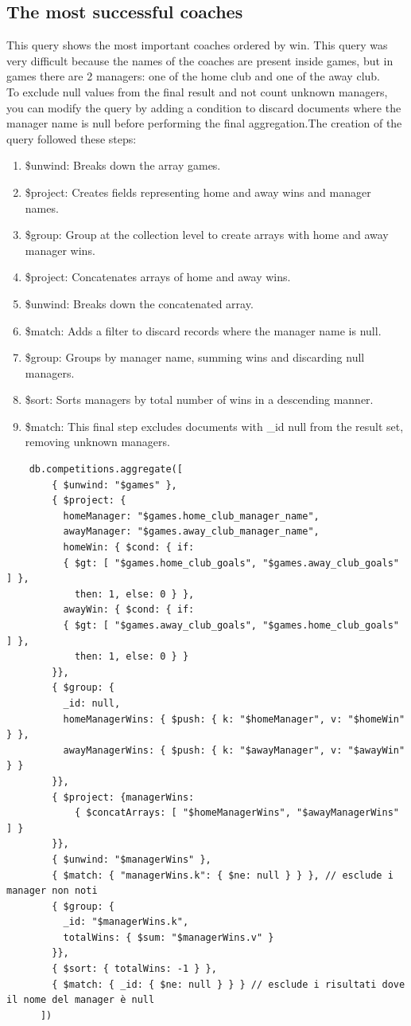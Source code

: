\documentclass{Configuration_Files/PoliMi3i_thesis}
\begin{document}
\subsection{The most successful coaches}
This query shows the most important coaches ordered by win. This query was very difficult because the names of the coaches are present inside games, but in games there are 2 managers: one of the home club and one of the away club.\\
To exclude null values from the final result and not count unknown managers, you can modify the query by adding a condition to discard documents where the manager name is null before performing the final aggregation.The creation of the query followed these steps:
\begin{enumerate}
    \item \$unwind: Breaks down the array games.
    \item \$project: Creates fields representing home and away wins and manager names.
    \item \$group: Group at the collection level to create arrays with home and away manager wins.
    \item \$project: Concatenates arrays of home and away wins.
    \item \$unwind: Breaks down the concatenated array.
    \item \$match: Adds a filter to discard records where the manager name is null.
    \item \$group: Groups by manager name, summing wins and discarding null managers.
    \item \$sort: Sorts managers by total number of wins in a descending manner.
    \item \$match: This final step excludes documents with \_id null from the result set, removing unknown managers.
\end{enumerate}
\begin{verbatim}
    db.competitions.aggregate([
        { $unwind: "$games" },
        { $project: {
          homeManager: "$games.home_club_manager_name",
          awayManager: "$games.away_club_manager_name",
          homeWin: { $cond: { if: 
          { $gt: [ "$games.home_club_goals", "$games.away_club_goals" ] }, 
            then: 1, else: 0 } },
          awayWin: { $cond: { if: 
          { $gt: [ "$games.away_club_goals", "$games.home_club_goals" ] }, 
            then: 1, else: 0 } }
        }},
        { $group: {
          _id: null,
          homeManagerWins: { $push: { k: "$homeManager", v: "$homeWin" } },
          awayManagerWins: { $push: { k: "$awayManager", v: "$awayWin" } }
        }},
        { $project: {managerWins: 
            { $concatArrays: [ "$homeManagerWins", "$awayManagerWins" ] }
        }},
        { $unwind: "$managerWins" },
        { $match: { "managerWins.k": { $ne: null } } }, // esclude i manager non noti
        { $group: {
          _id: "$managerWins.k",
          totalWins: { $sum: "$managerWins.v" }
        }},
        { $sort: { totalWins: -1 } },
        { $match: { _id: { $ne: null } } } // esclude i risultati dove il nome del manager è null
      ])
      
\end{verbatim}
\end{document}
